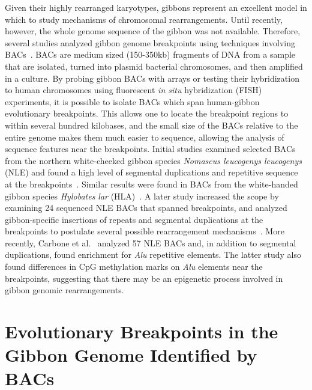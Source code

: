 Given their highly rearranged karyotypes, gibbons represent an excellent model in which to study mechanisms of chromosomal rearrangements. Until recently, however, the whole genome sequence of the gibbon was not available. Therefore, several studies analyzed gibbon genome breakpoints using techniques involving BACs~\cite{Girirajan:2009kw,Carbone:2006jk,Carbone:2009p1012}. BACs are medium sized (150-350kb) fragments of DNA from a sample that are isolated, turned into plasmid bacterial chromosomes, and then amplified in a culture. By probing gibbon BACs with arrays or testing their hybridization to human chromosomes using fluorescent \emph{in situ} hybridization (FISH) experiments, it is possible to isolate BACs which span human-gibbon evolutionary breakpoints. This allows one to locate the breakpoint regions to within several hundred kilobases, and the small size of the BACs relative to the entire genome makes them much easier to sequence, allowing the analysis of sequence features near the breakpoints. Initial studies examined selected BACs from the northern white-cheeked gibbon species \emph{Nomascus leucogenys leucogenys} (NLE) and found a high level of segmental duplications and repetitive sequence at the breakpoints~\cite{Carbone:2006jk,Roberto:2007dt}. Similar results were found in BACs from the white-handed gibbon species \emph{Hylobates lar} (HLA)~\cite{Misceo:2008kg}. A later study increased the scope by examining 24 sequenced NLE BACs that spanned breakpoints, and analyzed gibbon-specific insertions of repeats and segmental duplications at the breakpoints to postulate several possible rearrangement mechanisms~\cite{Girirajan:2009kw}. More recently, Carbone et al.~\cite{Carbone:2009p1012} analyzed 57 NLE BACs and, in addition to segmental duplications, found enrichment for \emph{Alu} repetitive elements. The latter study also found differences in CpG methylation marks on \emph{Alu} elements near the breakpoints, suggesting that there may be an epigenetic process involved in gibbon genomic rearrangements.

\section{Evolutionary Breakpoints in the Gibbon Genome  Identified by BACs}\label{gibbon_breakpoint_bac_analysis}

